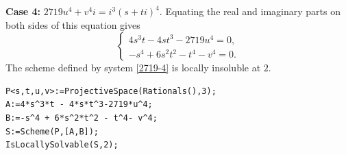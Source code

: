 \documentclass[a4paper,12pt,english,reqno]{amsart}
\begin{document}
{\bf Case 4:}  $2719u^4+v^4i=i^3(s+ti)^4$. Equating the real and imaginary parts on both sides of this equation gives
\begin{equation}\label{2719-4}
\begin{cases}
4s^3t - 4st^3 - 2719u^4=0,\\
-s^4 + 6s^2t^2 - t^4 - v^4=0.
\end{cases}
\end{equation}
The scheme defined by system \eqref{2719-4} is locally insoluble at $2$.


\begin{lstlisting}
P<s,t,u,v>:=ProjectiveSpace(Rationals(),3);
A:=4*s^3*t - 4*s*t^3-2719*u^4;
B:=-s^4 + 6*s^2*t^2 - t^4- v^4;
S:=Scheme(P,[A,B]);
IsLocallySolvable(S,2);
\end{lstlisting}
\end{document}
